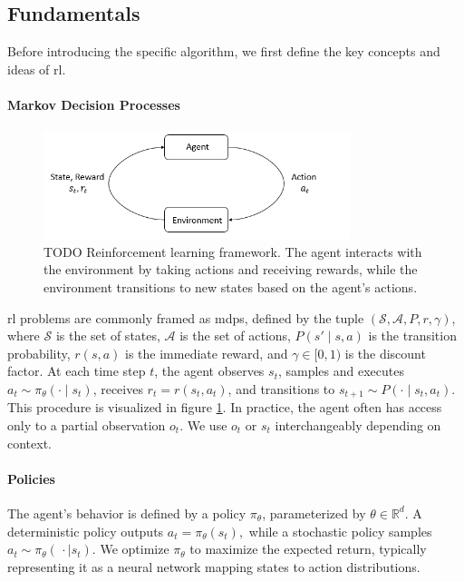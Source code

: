 \subsection{Fundamentals}
Before introducing the specific algorithm, we first define the key concepts and ideas of \gls{rl}.
\paragraph{Markov Decision Processes}

\begin{figure}
\centering
\includegraphics[width=0.8\textwidth]{images/rl_diagram.png}
\caption[Reinforcement learning framework]{TODO   Reinforcement learning framework. The agent interacts with the environment by taking actions and receiving rewards, while the environment transitions to new states based on the agent's actions.}
\label{fig:rl_diagram}
\end{figure}

\gls{rl} problems are commonly framed as \gls{mdp}s, defined by the tuple \((\mathcal{S}, \mathcal{A}, P, r, \gamma)\), where \(\mathcal{S}\) is the set of states, \(\mathcal{A}\) is the set of actions, \(P(s'\!\mid\!s,a)\) is the transition probability, \(r(s,a)\) is the immediate reward, and \(\gamma \in [0,1)\) is the discount factor. At each time step \(t\), the agent observes \(s_t\), samples and executes \(a_t \sim \pi_\theta(\cdot\mid s_t)\), receives \(r_t = r(s_t,a_t)\), and transitions to \(s_{t+1} \sim P(\cdot\mid s_t,a_t)\). This procedure is visualized in figure \ref{fig:rl_diagram}. In practice, the agent often has access only to a partial observation \(o_t\). We use \(o_t\) or \(s_t\) interchangeably depending on context.

\paragraph{Policies}
The agent’s behavior is defined by a policy \(\pi_{\theta}\), parameterized by \(\theta \in \mathbb{R}^{d}\). A deterministic policy outputs
$ 
a_t = \pi_{\theta}(s_t),
$
while a stochastic policy samples
$
a_t \sim \pi_{\theta}(\,\cdot\mid s_t).
$
We optimize \(\pi_\theta\) to maximize the expected return, typically representing it as a neural network mapping states to action distributions.

